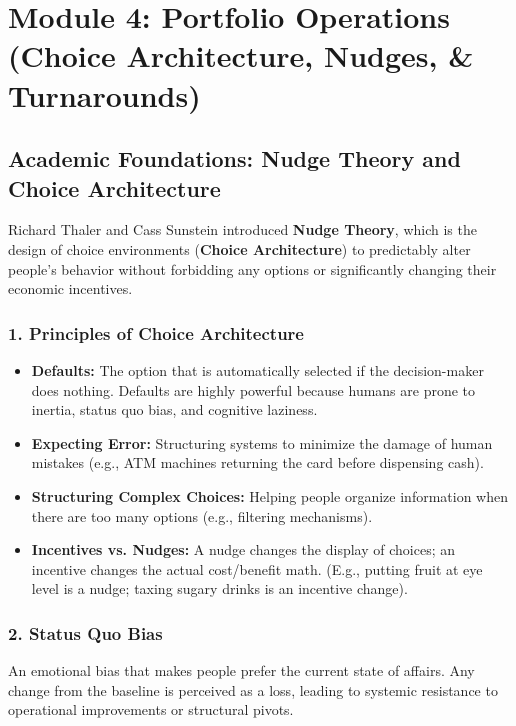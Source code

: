 \documentclass[11pt,a4paper]{article}
\begin{document}
\newpage
\section{Module 4: Portfolio Operations (Choice Architecture, Nudges, \& Turnarounds)}

\subsection{Academic Foundations: Nudge Theory and Choice Architecture}
Richard Thaler and Cass Sunstein introduced \textbf{Nudge Theory}, which is the design of choice environments (\textbf{Choice Architecture}) to predictably alter people's behavior without forbidding any options or significantly changing their economic incentives.

\subsubsection{1. Principles of Choice Architecture}
\begin{itemize}
    \item \textbf{Defaults:} The option that is automatically selected if the decision-maker does nothing. Defaults are highly powerful because humans are prone to inertia, status quo bias, and cognitive laziness.
    \item \textbf{Expecting Error:} Structuring systems to minimize the damage of human mistakes (e.g., ATM machines returning the card before dispensing cash).
    \item \textbf{Structuring Complex Choices:} Helping people organize information when there are too many options (e.g., filtering mechanisms).
    \item \textbf{Incentives vs. Nudges:} A nudge changes the display of choices; an incentive changes the actual cost/benefit math. (E.g., putting fruit at eye level is a nudge; taxing sugary drinks is an incentive change).
\end{itemize}

\subsubsection{2. Status Quo Bias}
An emotional bias that makes people prefer the current state of affairs. Any change from the baseline is perceived as a loss, leading to systemic resistance to operational improvements or structural pivots.
\end{document}
